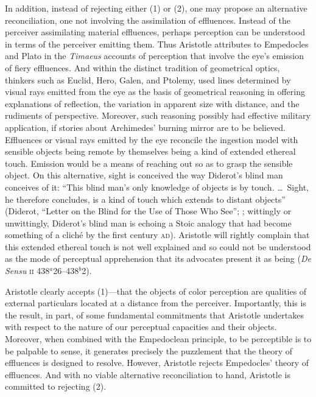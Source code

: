 In addition, instead of rejecting either (1) or (2), one may propose an alternative reconciliation, one not involving the assimilation of effluences. Instead of the perceiver assimilating material effluences, perhaps perception can be understood in terms of the perceiver emitting them. Thus Aristotle attributes to Empedocles and Plato in the \emph{Timaeus} accounts of perception that involve the eye's emission of fiery effluences. And within the distinct tradition of geometrical optics, thinkers such as Euclid, Hero, Galen, and Ptolemy, used lines determined by visual rays emitted from the eye as the basis of geometrical reasoning in offering explanations of reflection, the variation in apparent size with distance, and the rudiments of perspective. Moreover, such reasoning possibly had effective military application, if stories about Archimedes' burning mirror are to be believed. Effluences or visual rays emitted by the eye reconcile the ingestion model with sensible objects being remote by themselves being a kind of extended ethereal touch. Emission would be a means of reaching out so as to grasp the sensible object. On this alternative, sight is conceived the way Diderot's blind man conceives of it: ``This blind man's only knowledge of objects is by touch. \ldots\ Sight, he therefore concludes, is a kind of touch which extends to distant objects'' (Diderot, ``Letter on the Blind for the Use of Those Who See''; \citealt[72]{Jourdain:1916aa}; wittingly or unwittingly, Diderot's blind man is echoing a Stoic analogy that had become something of a clich\'{e} by the first century \textsc{ad}). Aristotle will rightly complain that this extended ethereal touch is not well explained and so could not be understood as the mode of perceptual apprehension that its advocates present it as being (\emph{De Sensu} \textsc{ii} 438\( ^{a} \)26--438\( ^{b} \)2).

Aristotle clearly accepts (1)---that the objects of color perception are qualities of external particulars located at a distance from the perceiver. Importantly, this is the result, in part, of some fundamental commitments that Aristotle undertakes with respect to the nature of our perceptual capacities and their objects. Moreover, when combined with the Empedoclean principle, to be perceptible is to be palpable to sense, it generates precisely the puzzlement that the theory of effluences is designed to resolve. However, Aristotle rejects Empedocles' theory of effluences. And with no viable alternative reconciliation to hand, Aristotle is committed to rejecting (2).

